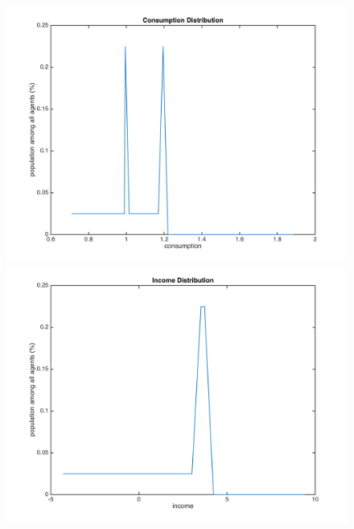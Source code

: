 \documentclass{article}[a4paper]
\begin{document}
\begin{figure}[htbp]
\centering
\begin{minipage}[t]{0.48\textwidth}
\includegraphics[width=\textwidth]{img/consumdist.png}
\end{minipage}

\begin{minipage}[t]{0.48\textwidth}
\centering
\includegraphics[width=\textwidth]{img/incomedist.png}
\end{minipage}


\end{figure}
\end{document}
